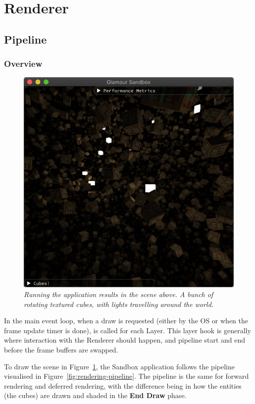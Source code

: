 \section{Renderer}\label{sec:renderer}


\subsection{Pipeline}

\subsubsection{Overview}

\begin{figure}
  \begin{center}
    \includegraphics[width=0.6\columnwidth]{../sandbox.png}
  \end{center}
  \caption[Sandbox screenshot]{
    \emph{
      Running the application results in the scene above.
      A bunch of rotating textured cubes, with lights travelling around the world.
    }
  }\label{fig:sandbox-screenshot}
\end{figure}

In the main event loop, when a draw is requested (either by the OS or when the frame update timer is done),  is called for each Layer.
This layer hook is generally where interaction with the Renderer should happen, and pipeline start and end before the frame buffers are swapped.

To draw the scene in Figure~\ref{fig:sandbox-screenshot}, the Sandbox application follows the pipeline visualised in Figure~\ref{fig:rendering-pipeline}.
The pipeline is the same for forward rendering and deferred rendering, with the difference being in how the entities (the cubes) are drawn and shaded in the \textbf{End Draw} phase.

